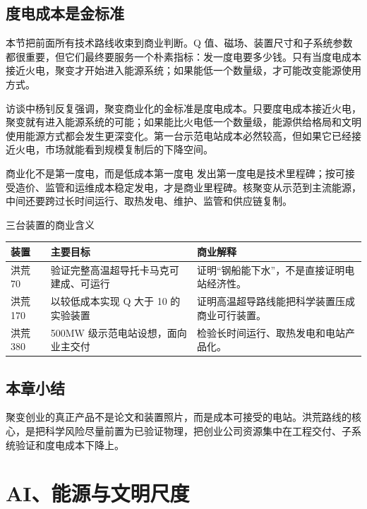 \documentclass[a4paper]{article}
\begin{document}
\subsection{度电成本是金标准}

本节把前面所有技术路线收束到商业判断。Q 值、磁场、装置尺寸和子系统参数都很重要，但它们最终要服务一个朴素指标：发一度电要多少钱。只有当度电成本接近火电，聚变才开始进入能源系统；如果能低一个数量级，才可能改变能源使用方式。

访谈中杨钊反复强调，聚变商业化的金标准是度电成本。只要度电成本接近火电，聚变就有进入能源系统的可能；如果能比火电低一个数量级，能源供给格局和文明使用能源方式都会发生更深变化。第一台示范电站成本必然较高，但如果它已经接近火电，市场就能看到规模复制后的下降空间。

\begin{importantbox}{商业化不是第一度电，而是低成本第一度电}
发出第一度电是技术里程碑；按可接受造价、监管和运维成本稳定发电，才是商业里程碑。核聚变从示范到主流能源，中间还要跨过长时间运行、取热发电、维护、监管和供应链复制。
\end{importantbox}

\begin{knowledgebox}{三台装置的商业含义}
\begin{tabularx}{\textwidth}{p{}p{}X}
\toprule
装置 & 主要目标 & 商业解释 \\
\midrule
洪荒 70 & 验证完整高温超导托卡马克可建成、可运行 & 证明“钢船能下水”，不是直接证明电站经济性。 \\
洪荒 170 & 以较低成本实现 Q 大于 10 的实验装置 & 证明高温超导路线能把科学装置压成商业可行装置。 \\
洪荒 380 & 500MW 级示范电站设想，面向业主交付 & 检验长时间运行、取热发电和电站产品化。 \\
\bottomrule
\end{tabularx}
\end{knowledgebox}

\subsection{本章小结}

聚变创业的真正产品不是论文和装置照片，而是成本可接受的电站。洪荒路线的核心，是把科学风险尽量前置为已验证物理，把创业公司资源集中在工程交付、子系统验证和度电成本下降上。

\section{AI、能源与文明尺度}
\end{document}
